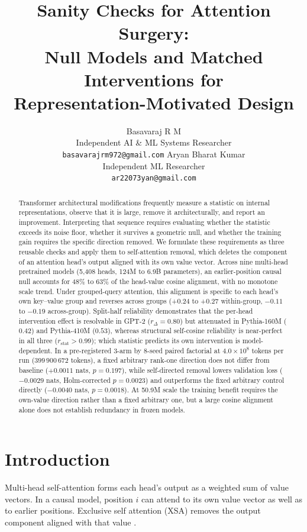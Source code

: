 \documentclass{article} %
\title{Sanity Checks for Attention Surgery: \\
Null Models and Matched Interventions for \\
Representation-Motivated Design}
\author{\hfil Basavaraj R M\\[3pt]
\hspace{0.3cm}Independent AI \& ML Systems Researcher\\[3pt]
\hspace{0.3cm}\hfil\texttt{basavarajrm972@gmail.com}
\And
\hfil Aryan Bharat Kumar\\[3pt]
\hspace{0.3cm}Independent ML Researcher\\[3pt]
\hspace{0.3cm}\hfil\texttt{ar22073yan@gmail.com}
}
\begin{document}
\maketitle
{}

\begin{abstract}
Transformer architectural modifications frequently measure a statistic on internal representations, observe that it is large, remove it architecturally, and report an improvement. Interpreting that sequence requires evaluating whether the statistic exceeds its noise floor, whether it survives a geometric null, and whether the training gain requires the specific direction removed. We formulate these requirements as three reusable checks and apply them to self-attention removal, which deletes the component of an attention head's output aligned with its own value vector. Across nine multi-head pretrained models (5,408 heads, 124M to 6.9B parameters), an earlier-position causal null accounts for 48\% to 63\% of the head-value cosine alignment, with no monotone scale trend. Under grouped-query attention, this alignment is specific to each head's own key--value group and reverses across groups (+0.24 to +0.27 within-group, $-0.11$ to $-0.19$ across-group). Split-half reliability demonstrates that the per-head intervention effect is resolvable in GPT-2 ($r_\Delta = 0.80$) but attenuated in Pythia-160M ($0.42$) and Pythia-410M ($0.53$), whereas structural self-cosine reliability is near-perfect in all three ($r_{\text{stat}} > 0.99$); which statistic predicts its own intervention is model-dependent. In a pre-registered 3-arm by 8-seed paired factorial at $4.0\times10^{8}$ tokens per run ($399\,900\,672$ tokens), a fixed arbitrary rank-one direction does not differ from baseline ($+0.0011$ nats, $p = 0.197$), while self-directed removal lowers validation loss ($-0.0029$ nats, Holm-corrected $p = 0.0023$) and outperforms the fixed arbitrary control directly ($-0.0040$ nats, $p = 0.0018$). At 50.9M scale the training benefit requires the own-value direction rather than a fixed arbitrary one, but a large cosine alignment alone does not establish redundancy in frozen models.
\end{abstract}

\section{Introduction}

Multi-head self-attention \citep{vaswani2017attention} forms each head's
output as a weighted sum of value vectors. In a causal model, position $i$
can attend to its own value vector as well as to earlier positions. Exclusive
self attention (XSA) removes the output component aligned with that value
\citep{zhai2026xsa}.
\end{document}

